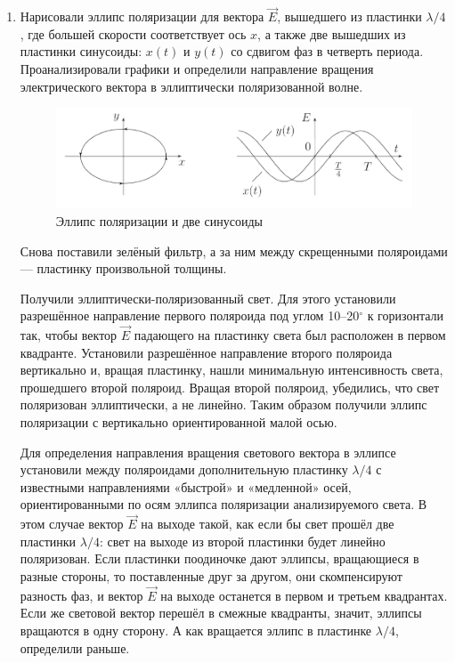\documentclass[a4paper, 12pt]{article}%
\begin{document}
\begin{enumerate}
\item Нарисовали эллипс поляризации для вектора	$\vec{E}$, вышедшего из пластинки $\lambda/4$, где большей скорости соответствует ось $x$, а также две вышедших из пластинки синусоиды: $x(t)$ и $y(t)$ со сдвигом фаз в четверть периода. Проанализировали графики и определили направление вращения электрического вектора в эллиптически поляризованной волне. 

\begin{figure}[h!]
\centering
\includegraphics[scale=1]{images/pol_ellips.png}
\caption{Эллипс поляризации и две синусоиды}
\label{pol_ellips}
\end{figure}

Снова поставили зелёный фильтр, а за ним между скрещенными поляроидами --- пластинку произвольной толщины.

Получили эллиптически-поляризованный свет. Для этого установили разрешённое направление первого поляроида под углом 10–20$^\circ$ к горизонтали так, чтобы вектор $\vec{E}$ падающего на пластинку света был расположен в первом квадранте. Установили разрешённое направление второго поляроида вертикально и, вращая пластинку, нашли минимальную интенсивность света, прошедшего второй поляроид. Вращая второй поляроид, убедились, что свет поляризован эллиптически, а не линейно. Таким образом получили эллипс поляризации с вертикально ориентированной малой осью.

Для определения направления вращения светового вектора в эллипсе установили между поляроидами дополнительную пластинку $\lambda/4$ с известными направлениями «быстрой» и «медленной» осей, ориентированными по осям эллипса поляризации анализируемого света. В этом случае вектор $\vec{E}$ на выходе такой, как если бы свет прошёл две пластинки $\lambda/4$: свет на выходе из второй пластинки будет линейно поляризован. Если пластинки поодиночке дают эллипсы, вращающиеся в разные стороны, то поставленные друг за другом, они скомпенсируют разность фаз, и вектор $\vec{E}$ на выходе останется в первом и третьем квадрантах. Если же световой вектор перешёл в смежные квадранты, значит, эллипсы вращаются в одну сторону. А как вращается эллипс в пластинке $\lambda/4$, определили раньше.
	

\end{enumerate}
\end{document}
